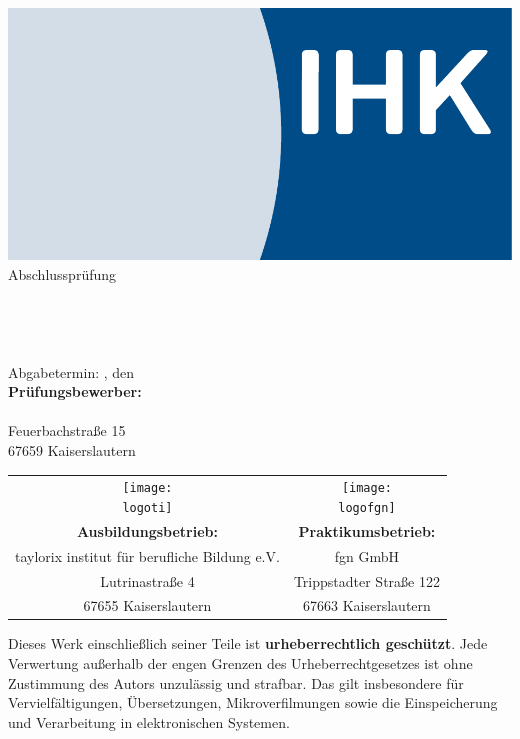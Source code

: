\thispagestyle{plain}
\begin{titlepage}
\begin{center}
\includegraphics[scale=0.25]{Bilder/LogoIHK.pdf}\\[1ex]
\Large{Abschlussprüfung \pruefungstermin}\\[3ex]

\Large{\ausbildungsberuf}\\
\LARGE{\betreff}\\[4ex]

\huge{\textbf{\titel}}\\[1.5ex]
\Large{\textbf{\untertitelkun}}\\[4ex]

\normalsize
Abgabetermin: \ort, den \abgabetermin\\[3em]
\textbf{Prüfungsbewerber:}\\
\autor\\
Feuerbachstraße 15\\
67659 Kaiserslautern\\[5ex]
\end{center}

\begin{tabularx}{\textwidth}{c c}
\texttt{[image: \\logoti]} &\texttt{[image: \\logofgn]}\\[2ex]
\textbf{Ausbildungsbetrieb:} &	\textbf{Praktikumsbetrieb:}\\
taylorix institut für berufliche Bildung e.V. &	fgn GmbH\\
Lutrinastraße 4 &	Trippstadter Straße 122\\
67655 Kaiserslautern &	67663 Kaiserslautern\\[5em]
\end{tabularx}

\small
\noindent
Dieses Werk einschließlich seiner Teile ist \textbf{urheberrechtlich geschützt}. 
Jede Verwertung außerhalb der engen Grenzen des Urheberrechtgesetzes ist ohne 
Zustimmung des Autors unzulässig und strafbar. Das gilt insbesondere für 
Vervielfältigungen, Übersetzungen, Mikroverfilmungen sowie die Einspeicherung 
und Verarbeitung in elektronischen Systemen.

\end{titlepage}